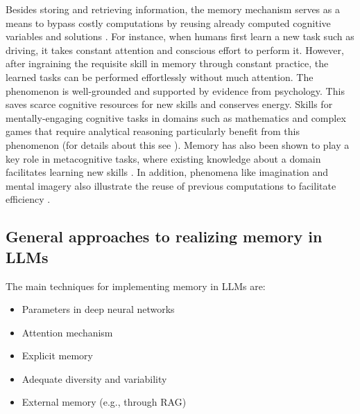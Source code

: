 \documentclass[10pt,journal,compsoc]{IEEEtran}
\begin{document}
	Besides storing and retrieving information, the memory mechanism serves as a means to bypass costly computations by reusing already computed cognitive variables and solutions \cite{dasgupta2021memory,bordalo2023memory}. For instance, when humans first learn a new task such as driving, it takes constant attention and conscious effort to perform it. However, after ingraining the requisite skill in memory through constant practice, the learned tasks can be performed effortlessly without much attention.  The phenomenon is well-grounded and supported by evidence from psychology. This saves scarce cognitive resources for new skills and conserves energy. Skills for mentally-engaging cognitive tasks in domains such as mathematics and complex games that require analytical reasoning particularly benefit from this phenomenon (for details about this see \cite{dasgupta2021memory,bordalo2023memory}). Memory has also been shown to play a key role in metacognitive tasks, where existing knowledge about a domain facilitates learning new skills \cite{ganapini2022thinking,spivack2024cognition,langdon2022meta}.  In addition, phenomena like imagination and mental imagery also illustrate the reuse of previous computations to facilitate efficiency \cite{dasgupta2021memory}. 
	
	
	
	\subsection{General approaches to realizing memory in LLMs }
	The main techniques for implementing memory in LLMs are:
	
	
	\begin{itemize}
		
		\item Parameters in deep neural networks
		
		\item Attention mechanism
		
		\item Explicit memory
		
		\item Adequate diversity and variability
		
		\item External memory (e.g., through RAG)
	\end{itemize}
	
\end{document}
